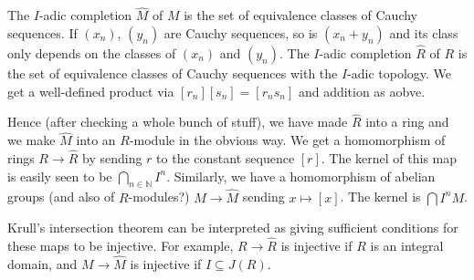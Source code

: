 The $I$-adic completion $\hat{M}$ of $M$ is the set of equivalence classes of
Cauchy sequences. If $(x_n)$, $(y_n)$ are Cauchy sequences, so is $(x_n + y_n)$ and
its class only depends on the classes of $(x_n)$ and $(y_n)$. The $I$-adic completion
$\hat{R}$ of $R$ is the set of equivalence classes of Cauchy sequences with the
$I$-adic topology. We get a well-defined product via $[r_n][s_n] = [r_ns_n]$ and
addition as aobve.

Hence (after checking a whole bunch of stuff), we have made $\hat{R}$ into a ring
and we make $\hat{M}$ into an $R$-module in the obvious way. We get a homomorphism
of rings $R\to \hat{R}$ by sending $r$ to the constant sequence $[r]$. The
kernel of this map is easily seen to be $\bigcap_{n \in \mathbb{N}} I^n$. Similarly,
we have a homomorphism of abelian groups (and also of $R$-modules?)
$M\to \hat{M}$ sending $x\mapsto [x]$. The kernel is $\bigcap I^nM$.

Krull's intersection theorem can be interpreted as giving sufficient conditions for
these maps to be injective. For example, $R\to \hat{R}$ is injective if $R$ is
an integral domain, and $M\to \hat{M}$ is injective if $I \subseteq J(R)$.
